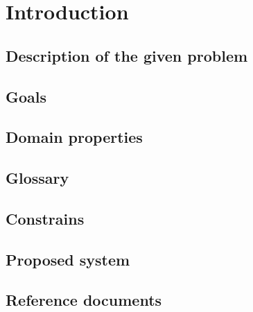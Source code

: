 \chapter{Introduction}

\section{Description of the given problem}
\section{Goals}
\section{Domain properties}
\section{Glossary}
\section{Constrains}
\section{Proposed system}
\section{Reference documents}
